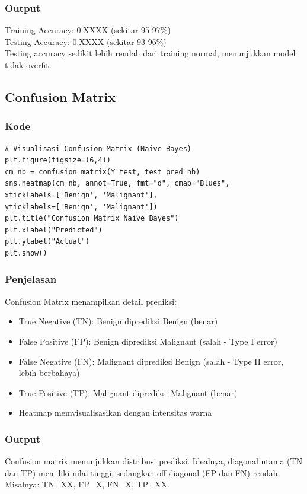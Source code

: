 \documentclass[12pt,a4paper]{article}
\begin{document}
\subsubsection{Output}
Training Accuracy: 0.XXXX (sekitar 95-97\%)\\
Testing Accuracy: 0.XXXX (sekitar 93-96\%)\\
Testing accuracy sedikit lebih rendah dari training normal, menunjukkan model tidak overfit.

\subsection{Confusion Matrix}

\subsubsection{Kode}
\begin{lstlisting}[style=pythonstyle]
# Visualisasi Confusion Matrix (Naive Bayes)
plt.figure(figsize=(6,4))
cm_nb = confusion_matrix(Y_test, test_pred_nb)
sns.heatmap(cm_nb, annot=True, fmt="d", cmap="Blues",
xticklabels=['Benign', 'Malignant'],
yticklabels=['Benign', 'Malignant'])
plt.title("Confusion Matrix Naive Bayes")
plt.xlabel("Predicted")
plt.ylabel("Actual")
plt.show()
\end{lstlisting}

\subsubsection{Penjelasan}
Confusion Matrix menampilkan detail prediksi:
\begin{itemize}
    \item True Negative (TN): Benign diprediksi Benign (benar)
    \item False Positive (FP): Benign diprediksi Malignant (salah - Type I error)
    \item False Negative (FN): Malignant diprediksi Benign (salah - Type II error, lebih berbahaya)
    \item True Positive (TP): Malignant diprediksi Malignant (benar)
    \item Heatmap memvisualisasikan dengan intensitas warna
\end{itemize}

\subsubsection{Output}
Confusion matrix menunjukkan distribusi prediksi. Idealnya, diagonal utama (TN dan TP) memiliki nilai tinggi, sedangkan off-diagonal (FP dan FN) rendah. Misalnya: TN=XX, FP=X, FN=X, TP=XX.
\end{document}
